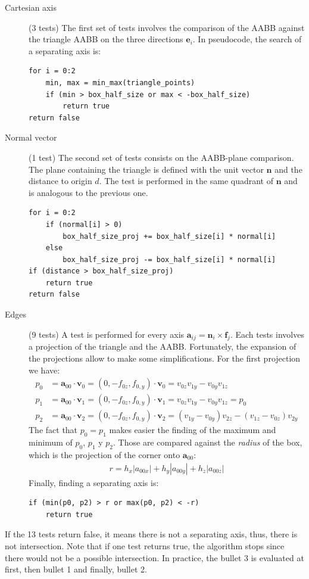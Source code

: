 \begin{description}
    \item[Cartesian axis] (3 tests) The first set of tests involves the comparison of the AABB against the triangle AABB on the three directions $\mathbf{e}_i$. In pseudocode, the search of a separating axis is:
    \begin{verbatim}
for i = 0:2
    min, max = min_max(triangle_points)
    if (min > box_half_size or max < -box_half_size)
        return true
return false
    \end{verbatim}
    \item[Normal vector] (1 test) The second set of tests consists on the AABB-plane comparison. The plane containing the triangle is defined with the unit vector $\mathbf{n}$ and the distance to origin $d$. The test is performed in the same quadrant of $\mathbf{n}$ and is analogous to the previous one.
    \begin{verbatim}
for i = 0:2
    if (normal[i] > 0)
        box_half_size_proj += box_half_size[i] * normal[i]
    else
        box_half_size_proj -= box_half_size[i] * normal[i]
if (distance > box_half_size_proj)
    return true
return false
    \end{verbatim}
    \item[Edges] (9 tests) A test is performed for every axis $\mathbf{a}_{ij} = \mathbf{n}_i \times \mathbf{f}_j$. Each tests involves a projection of the triangle and the AABB. Fortunately, the expansion of the projections allow to make some simplifications. For the first projection we have:
    \begin{align*}
        p_0 &= \mathbf{a}_{00} \cdot \mathbf{v}_0 = (0, -f_{0z}, f_{0,y}) \cdot \mathbf{v}_0 = v_{0z}v_{1y} - v_{0y}v_{1z} \\
        p_1 &= \mathbf{a}_{00} \cdot \mathbf{v}_1 = (0, -f_{0z}, f_{0,y}) \cdot \mathbf{v}_1 = v_{0z}v_{1y} - v_{0y}v_{1z} = p_0 \\
        p_2 &= \mathbf{a}_{00} \cdot \mathbf{v}_2 = (0, -f_{0z}, f_{0,y}) \cdot \mathbf{v}_2 = (v_{1y} - v_{0y}) v_{2z} - (v_{1z} - v_{0z}) v_{2y}
    \end{align*}
    The fact that $p_0 = p_1$ makes easier the finding of the maximum and minimum of $p_0$, $p_1$ y $p_2$. Those are compared against the \emph{radius} of the box, which is the projection of the corner onto $\mathbf{a}_{00}$:
    \begin{align*}
        r = h_x |a_{00x}| + h_y |a_{00y}| + h_z |a_{00z}|
    \end{align*}
    Finally, finding a separating axis is:
    \begin{verbatim}
if (min(p0, p2) > r or max(p0, p2) < -r)
    return true
    \end{verbatim}
\end{description}
If the 13 tests return false, it means there is not a separating axis, thus, there is not intersection. Note that if one test returns true, the algorithm stops since there would not be a possible intersection.
In practice, the bullet 3 is evaluated at first, then bullet 1 and finally, bullet 2.



